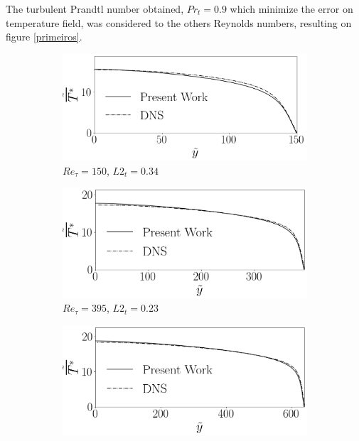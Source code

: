 \documentclass[10pt]{article} %
\begin{document}
The turbulent Prandtl number obtained, $Pr_t = 0.9$ which minimize the error on temperature field, was considered to the others Reynolds numbers, resulting on figure \ref{primeiros}.
\begin{figure}[!h]
	\centering
	\begin{subfigure}[t]{0.5\textwidth}
		\centering
		\includegraphics[angle=0, scale=0.24]{fotos_formatacao_final/Temperature_150_071_Prt0905_A26}
		\caption{$Re_\tau = 150$, $L2_t = 0.34$}
	\end{subfigure}
	\begin{subfigure}[t]{0.45\textwidth}
		\centering
		\includegraphics[angle=0, scale=0.24]{fotos_formatacao_final/Temperature_395_071_Prt0905_A26}
		\caption{$Re_\tau = 395$, $L2_t = 0.23$}
	\end{subfigure}
	\begin{subfigure}[t]{0.5\textwidth}
		\centering
		\includegraphics[angle=0, scale=0.24]{fotos_formatacao_final/Temperature_640_071_Prt0905_A26}

\end{subfigure}
\end{figure}
\end{document}
